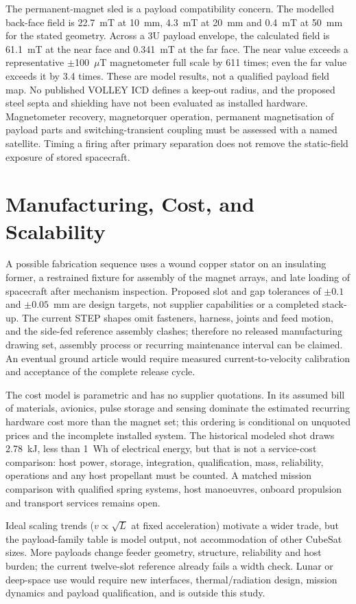 \documentclass[conference]{IEEEtran}
\begin{document}
The permanent-magnet sled is a payload compatibility concern. The modelled back-face field is 22.7~mT at 10~mm, 4.3~mT at 20~mm and 0.4~mT at 50~mm for the stated geometry. Across a 3U payload envelope, the calculated field is 61.1~mT at the near face and 0.341~mT at the far face. The near value exceeds a representative $\pm$100~$\mu$T magnetometer full scale by 611 times; even the far value exceeds it by 3.4 times. These are model results, not a qualified payload field map. No published VOLLEY ICD defines a keep-out radius, and the proposed steel septa and shielding have not been evaluated as installed hardware. Magnetometer recovery, magnetorquer operation, permanent magnetisation of payload parts and switching-transient coupling must be assessed with a named satellite. Timing a firing after primary separation does not remove the static-field exposure of stored spacecraft.

\section{Manufacturing, Cost, and Scalability}\label{sec:mfg}
A possible fabrication sequence uses a wound copper stator on an insulating former, a restrained fixture for assembly of the magnet arrays, and late loading of spacecraft after mechanism inspection. Proposed slot and gap tolerances of $\pm0.1$ and $\pm0.05$~mm are design targets, not supplier capabilities or a completed stack-up. The current STEP shapes omit fasteners, harness, joints and feed motion, and the side-fed reference assembly clashes; therefore no released manufacturing drawing set, assembly process or recurring maintenance interval can be claimed. An eventual ground article would require measured current-to-velocity calibration and acceptance of the complete release cycle.

The cost model is parametric and has no supplier quotations. In its assumed bill of materials, avionics, pulse storage and sensing dominate the estimated recurring hardware cost more than the magnet set; this ordering is conditional on unquoted prices and the incomplete installed system. The historical modeled shot draws 2.78~kJ, less than 1~Wh of electrical energy, but that is not a service-cost comparison: host power, storage, integration, qualification, mass, reliability, operations and any host propellant must be counted. A matched mission comparison with qualified spring systems, host manoeuvres, onboard propulsion and transport services remains open.

Ideal scaling trends ($v\propto\sqrt{L}$ at fixed acceleration) motivate a wider trade, but the payload-family table is model output, not accommodation of other CubeSat sizes. More payloads change feeder geometry, structure, reliability and host burden; the current twelve-slot reference already fails a width check. Lunar or deep-space use would require new interfaces, thermal/radiation design, mission dynamics and payload qualification, and is outside this study.
\end{document}
